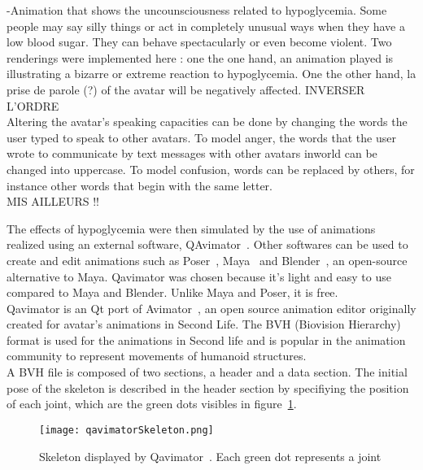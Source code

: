 -Animation that shows the uncounsciousness related to hypoglycemia. 
Some people may say silly things or act in completely unusual ways when they have a low blood sugar.
They can behave spectacularly or even become violent. Two renderings were implemented here : one the one hand, an animation played is illustrating a bizarre or extreme reaction to hypoglycemia. 
One the other hand, la prise de parole (?) of the avatar will be negatively affected. INVERSER L'ORDRE\\

Altering the avatar's speaking capacities can be done by changing the words the user typed to speak to other avatars.
To model anger, the words that the user wrote to communicate by text messages with other avatars inworld can be changed into uppercase. 
To model confusion, words can be replaced by others, for instance other words that begin with the same letter. \\

MIS AILLEURS !!

\iffalse

The effects of hypoglycemia were then simulated by the use of animations realized using an external software, QAvimator~\cite{qavimatorWebsite}. Other softwares can be used to create and edit animations such as Poser~\cite{PoserWebsite}, Maya~\cite{mayaWebsite} and Blender~\cite{BlenderWebsite}, an open-source alternative to Maya. Qavimator was chosen because it's light and easy to use compared to Maya and Blender. Unlike Maya and Poser, it is free.\\

Qavimator is an Qt port of Avimator~\cite{avimatorWebsite}, an open source animation editor originally created for avatar's animations in Second Life. The BVH (Biovision Hierarchy)~\cite{thingvold1999biovision} format is used for the animations in Second life and is popular in the animation community to represent movements of humanoid structures. \\

A BVH file is composed of two sections, a header and a data section. The initial pose of the skeleton is described in the header section by specifiying the position of each joint, which are the green dots visibles in figure~\ref{qavimatorSkeleton}. \\

\begin{figure}[h]
  \caption{Skeleton displayed by Qavimator~\cite{qavimatorWebsite}. Each green dot represents a joint}
  \centering
  \texttt{[image: qavimatorSkeleton.png]}
  \label{qavimatorSkeleton}
\end{figure}

